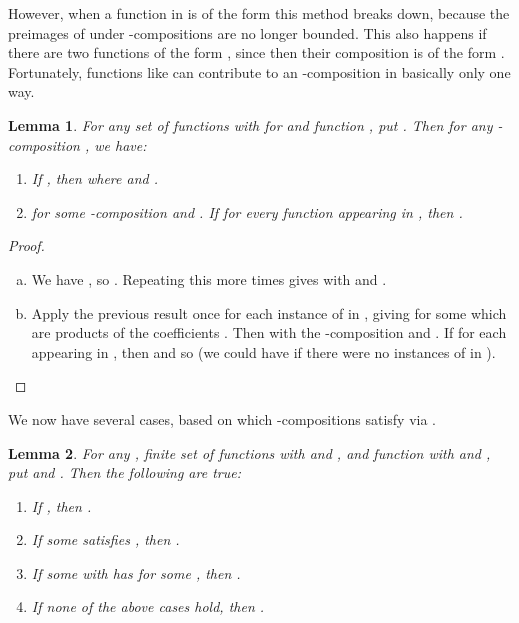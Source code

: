 \documentclass[11pt]{amsart}
\newcommand{\tab}{\;\;\;\;\;}
\newtheorem{lemma}{Lemma}
\theoremstyle{definition}
\theoremstyle{remark}
\begin{document}
However, when a function in  is of the form  this method breaks down, because the preimages of  under -compositions are no longer bounded. This also happens if there are two functions of the form , since then their composition is of the form . Fortunately, functions like  can contribute to an -composition in basically only one way.
\begin{lemma}
\label{extraction-lemma}
For any set  of functions  with  for  and function , put . Then for any -composition , we have:
\begin{enumerate}[\tab (a)]
\item If , then  where  and . \label{single-extraction}
\item  for some -composition  and . If  for every function  appearing in , then . \label{total-extraction}
\end{enumerate}
\end{lemma}
\begin{proof}
\begin{enumerate}[(a)]
\item We have , so . Repeating this  more times gives  with  and .
\item Apply the previous result once for each instance of  in , giving  for some  which are products of the coefficients . Then  with  the -composition  and . If  for each  appearing in , then  and so  (we could have  if there were no instances of  in ). \qedhere
\end{enumerate}
\end{proof}
We now have several cases, based on which -compositions  satisfy  via .
\begin{lemma} \label{lemma-cases}
For any , finite set  of functions  with  and , and function  with  and , put  and . Then the following are true:
\begin{enumerate}[\tab (A)]
\item If , then . \label{case-none}
\item If some  satisfies , then . \label{case-opposite-sign}
\item If some  with  has  for some , then . \label{case-negative-coeff}
\item If none of the above cases hold, then . \label{case-same-sign}
\end{enumerate}
\end{lemma}
\end{document}
